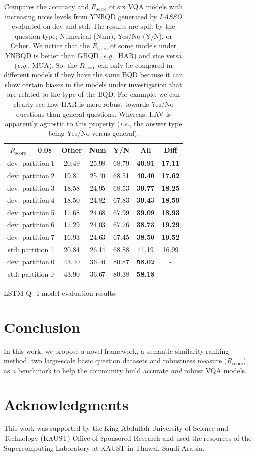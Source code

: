 \documentclass[letterpaper]{article}
\newcommand{\ie}{}\def\ie/{{\em i.e.}}
\newcommand{\eg}{}\def\eg/{{\em e.g.}}
\newcommand{\lasso}{}\def\lasso/{\textit{LASSO}}
\newcommand{\rscore}{}\def\rscore/{$R_{\text{score}}$}
\begin{document}
\begin{table}
\begin{subtable}{0.49\linewidth}
		\begin{tabular}{c | c c c c | c}
			\rscore/ = 0.08  & Other & Num   & Y/N   & All            & Diff           \\ [0.5ex]
			\hline
			dev: partition 1 & 20.49 & 25.98 & 68.79 & \textbf{40.91} & \textbf{17.11} \\
			dev: partition 2 & 19.81 & 25.40 & 68.51 & \textbf{40.40} & \textbf{17.62} \\
			dev: partition 3 & 18.58 & 24.95 & 68.53 & \textbf{39.77} & \textbf{18.25} \\
			dev: partition 4 & 18.50 & 24.82 & 67.83 & \textbf{39.43} & \textbf{18.59} \\
			dev: partition 5 & 17.68 & 24.68 & 67.99 & \textbf{39.09} & \textbf{18.93} \\
			dev: partition 6 & 17.29 & 24.03 & 67.76 & \textbf{38.73} & \textbf{19.29} \\
			dev: partition 7 & 16.93 & 24.63 & 67.45 & \textbf{38.50} & \textbf{19.52} \\
			\hline
			std: partition 1 & 20.84 & 26.14 & 68.88 & 41.19          & 16.99          \\
			\hline
			dev: partition 0 & 43.40 & 36.46 & 80.87 & \textbf{58.02} & -              \\
			std: partition 0 & 43.90 & 36.67 & 80.38 & \textbf{58.18} & -              \\
			\hline
		\end{tabular}
		\caption{LSTM Q+I model evaluation results.}
	\end{subtable}
	\caption{Compares the accuracy and \rscore/ of six VQA models with increasing noise levels from YNBQD generated by \lasso/ evaluated on dev and std. The results are split by the question type; Numerical (Num), Yes/No (Y/N), or Other. We notice that the \rscore/ of some models under YNBQD is better than GBQD (\eg/, HAR) and vice versa (\eg/, MUA). So, the \rscore/ can only be compared in different models if they have the same BQD because it can show certain biases in the models under investigation that are related to the type of the BQD. For example, we can clearly see how HAR is more robust towards Yes/No questions than general questions. Whereas, HAV is apparently agnostic to this property (\ie/, the answer type being Yes/No versus general).}
	\label{tbl:lasso_ynbqd}
\end{table}

\section{Conclusion}
In this work, we propose a novel framework, a semantic similarity ranking method, two large-scale basic question datasets and robustness measure (\rscore/) as a benchmark to help the community build accurate \emph{and} robust VQA models.

\section{Acknowledgments}
This work was supported by the King Abdullah University of Science and Technology (KAUST) Office of Sponsored Research and used the resources of the Supercomputing Laboratory at KAUST in Thuwal, Saudi Arabia.

{\small


}
\end{document}
